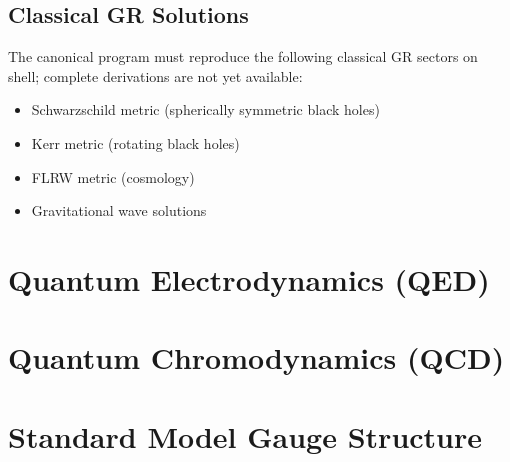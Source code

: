 \documentclass[12pt,a4paper]{article}
\begin{document}

\subsection{Classical GR Solutions}

The canonical program must reproduce the following classical GR sectors on shell; complete derivations are not yet available:

\begin{itemize}
    \item Schwarzschild metric (spherically symmetric black holes)
    \item Kerr metric (rotating black holes)
    \item FLRW metric (cosmology)
    \item Gravitational wave solutions
\end{itemize}



\section{Quantum Electrodynamics (QED)}
\label{sec:qed}




\section{Quantum Chromodynamics (QCD)}
\label{sec:qcd}




\section{Standard Model Gauge Structure}
\label{sec:sm_gauge}



\end{document}
